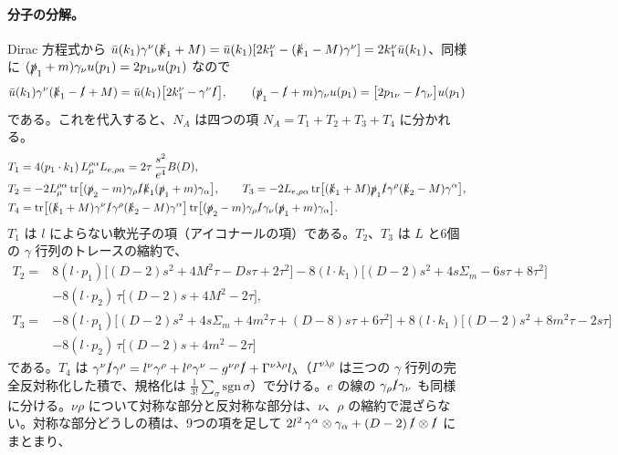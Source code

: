 \documentclass[a4paper,10pt]{ltjsarticle}
\begin{document}
\paragraph{分子の分解。}Dirac 方程式から $\bar u(k_1)\gamma^\nu(\slashed k_1+M)=\bar u(k_1)[2k_1^\nu-(\slashed k_1-M)\gamma^\nu]=2k_1^\nu\bar u(k_1)$、同様に $(\slashed p_1+m)\gamma_\nu u(p_1)=2p_{1\nu}u(p_1)$ なので
\begin{equation*}
\bar u(k_1)\gamma^\nu(\slashed k_1-\slashed l+M)=\bar u(k_1)\bigl[2k_1^\nu-\gamma^\nu\slashed l\bigr],\qquad
(\slashed p_1-\slashed l+m)\gamma_\nu u(p_1)=\bigl[2p_{1\nu}-\slashed l\gamma_\nu\bigr]u(p_1)
\end{equation*}
である。これを代入すると、$N_A$ は四つの項 $N_A=T_1+T_2+T_3+T_4$ に分かれる。
\begin{align*}
T_1&=4(p_1\cdot k_1)\,L_\mu^{\rho\alpha}L_{e,\rho\alpha}=2\tau\,\frac{s^2}{e^4}B(D),\\
T_2&=-2L_\mu^{\rho\alpha}\,\mathrm{tr}\bigl[(\slashed p_2-m)\gamma_\rho\slashed l\slashed k_1(\slashed p_1+m)\gamma_\alpha\bigr],\qquad
T_3=-2L_{e,\rho\alpha}\,\mathrm{tr}\bigl[(\slashed k_1+M)\slashed p_1\slashed l\gamma^\rho(\slashed k_2-M)\gamma^\alpha\bigr],\\
T_4&=\mathrm{tr}\bigl[(\slashed k_1+M)\gamma^\nu\slashed l\gamma^\rho(\slashed k_2-M)\gamma^\alpha\bigr]\,\mathrm{tr}\bigl[(\slashed p_2-m)\gamma_\rho\slashed l\gamma_\nu(\slashed p_1+m)\gamma_\alpha\bigr].
\end{align*}
$T_1$ は $l$ によらない軟光子の項（アイコナールの項）である。$T_2$、$T_3$ は $L$ と6個の $\gamma$ 行列のトレースの縮約で、
\begin{equation*}
\begin{aligned}
T_2={}&8(l\cdot p_1)\bigl[(D-2)s^2+4M^2\tau-Ds\tau+2\tau^2\bigr]-8(l\cdot k_1)\bigl[(D-2)s^2+4s\Sigma_m-6s\tau+8\tau^2\bigr]\\
&-8(l\cdot p_2)\,\tau\bigl[(D-2)s+4M^2-2\tau\bigr],\\
T_3={}&-8(l\cdot p_1)\bigl[(D-2)s^2+4s\Sigma_m+4m^2\tau+(D-8)s\tau+6\tau^2\bigr]+8(l\cdot k_1)\bigl[(D-2)s^2+8m^2\tau-2s\tau\bigr]\\
&-8(l\cdot p_2)\,\tau\bigl[(D-2)s+4m^2-2\tau\bigr]
\end{aligned}
\end{equation*}
である。$T_4$ は $\gamma^\nu\slashed l\gamma^\rho=l^\nu\gamma^\rho+l^\rho\gamma^\nu-g^{\nu\rho}\slashed l+\Gamma^{\nu\lambda\rho}l_\lambda$（$\Gamma^{\nu\lambda\rho}$ は三つの $\gamma$ 行列の完全反対称化した積で、規格化は $\frac{1}{3!}\sum_\sigma\mathrm{sgn}\,\sigma$）で分ける。$e$ の線の $\gamma_\rho\slashed l\gamma_\nu$ も同様に分ける。$\nu\rho$ について対称な部分と反対称な部分は、$\nu$、$\rho$ の縮約で混ざらない。対称な部分どうしの積は、9つの項を足して $2l^2\,\gamma^\alpha\otimes\gamma_\alpha+(D-2)\,\slashed l\otimes\slashed l$ にまとまり、
\end{document}
